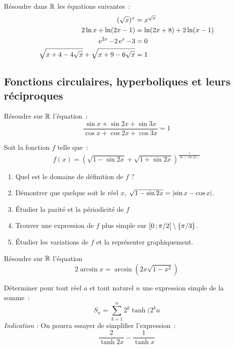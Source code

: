 \begin{exercice}
    Résoudre dans \(\mathbb{R}\) les équations suivantes~:
    \begin{align}
        (\sqrt{x})^x &= x^{\sqrt{x}} \\
        2\ln x + \ln(2x-1) &= \ln(2x+8) + 2\ln(x-1) \\
        \operatorname{e}^{2x} -2\operatorname{e}^x-3 &=0 \\
        \sqrt{x+4-4\sqrt{x}} + \sqrt{x+9-6\sqrt{x}} &= 1
    \end{align}
\end{exercice}
\subsection{Fonctions circulaires, hyperboliques et leurs réciproques}
\begin{exercice}
    Résoudre sur \(\mathbb{R}\) l'équation~:
    \begin{equation}
        \frac{\sin x + \sin 2x + \sin 3x}{\cos x + \cos 2x + \cos 3x} = 1
    \end{equation}
\end{exercice}
\begin{exercice}
    Soit la fonction \(f\) telle que~:
    \begin{equation}
        f(x) = (\sqrt{1-\sin 2x}+\sqrt{1+\sin 2x})^{\frac{1}{\ln(\cos 2x)}}
    \end{equation}
    \begin{enumerate}
        \item Quel est le domaine de définition de \(f\) ?
        \item Démontrer que quelque soit le réel \(x\), \(\sqrt{1-\sin 2x}=\left\lvert\sin x - \cos x\right\rvert\).
        \item Étudier la parité et la périodicité de \(f\)
        \item Trouver une expression de \(f\) plus simple sur \(\left[ 0 \, ;  \pi/2 \right[\setminus\{\pi/3\}\).
        \item Étudier les variations de \(f\) et la représenter graphiquement.
    \end{enumerate}
\end{exercice}
\begin{exercice}
    Résoudre sur \(\mathbb{R}\) l'équation
    \begin{equation}
        2\arcsin x = \arcsin(2x\sqrt{1-x^2})
    \end{equation}
\end{exercice}
\begin{exercice}
    Déterminer pour tout réel \(a\) et tout naturel \(n\) une expression simple de la somme~:
    \begin{equation}
        S_n = \sum_{k=1}^n 2^k \tanh(2^k a
    \end{equation}
    \emph{Indication :} On pourra essayer de simplifier l'expression~:
    \[\frac{2}{\tanh 2x} - \frac{1}{\tanh x}\]
\end{exercice}
